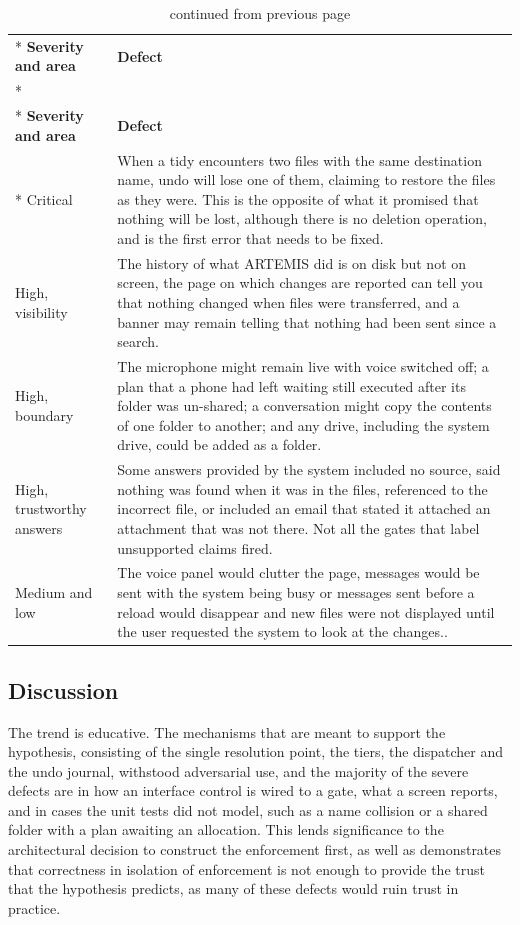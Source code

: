 \documentclass{FastFyp}
\begin{document}
{\small
{}
\begin{longtable}{|p{2.9cm}|p{11.0cm}|}
\caption{Principal defects found by the interface campaign.}\label{tab:defects}\\*
\hline
\textbf{Severity and area} & \textbf{Defect} \\*
\hline
\endfirsthead
\caption[]{continued from previous page}\\*
\hline
\textbf{Severity and area} & \textbf{Defect} \\*
\hline
\endhead
Critical & When a tidy encounters two files with the same destination name, undo will lose one of them, claiming to restore the files as they were. This is the opposite of what it promised that nothing will be lost, although there is no deletion operation, and is the first error that needs to be fixed. \\
\hline
High, visibility & The history of what ARTEMIS did is on disk but not on screen, the page on which changes are reported can tell you that nothing changed when files were transferred, and a banner may remain telling that nothing had been sent since a search. \\
\hline
High, boundary & The microphone might remain live with voice switched off; a plan that a phone had left waiting still executed after its folder was un-shared; a conversation might copy the contents of one folder to another; and any drive, including the system drive, could be added as a folder. \\
\hline
High, trustworthy answers & Some answers provided by the system included no source, said nothing was found when it was in the files, referenced to the incorrect file, or included an email that stated it attached an attachment that was not there. Not all the gates that label unsupported claims fired. \\
\hline
Medium and low & The voice panel would clutter the page, messages would be sent with the system being busy or messages sent before a reload would disappear and new files were not displayed until the user requested the system to look at the changes.. \\
\hline
\end{longtable}
}

\subsection{Discussion}
The trend is educative. The mechanisms that are meant to support the hypothesis, consisting of the single resolution point, the tiers, the dispatcher and the undo journal, withstood adversarial use, and the majority of the severe defects are in how an interface control is wired to a gate, what a screen reports, and in cases the unit tests did not model, such as a name collision or a shared folder with a plan awaiting an allocation. This lends significance to the architectural decision to construct the enforcement first, as well as demonstrates that correctness in isolation of enforcement is not enough to provide the trust that the hypothesis predicts, as many of these defects would ruin trust in practice.
\end{document}
